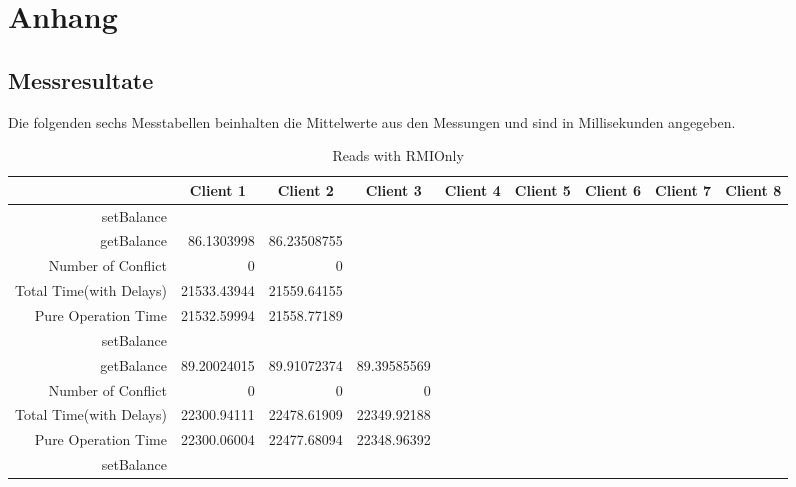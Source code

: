 
\chapter{Anhang}
\label{sec:messresultate}

\section{Messresultate}
\label{sec:messresultate-1}

Die folgenden sechs Messtabellen beinhalten die Mittelwerte aus den Messungen und sind in Millisekunden angegeben.

\begin{landscape}
\begin{table}[htbp]
  \scriptsize
  \centering
  \caption{Reads with RMIOnly}
    \begin{tabular}{rrrrrrrrr}
    \toprule
          & \multicolumn{1}{c}{Client 1} & \multicolumn{1}{c}{Client 2} & \multicolumn{1}{c}{Client 3} & \multicolumn{1}{c}{Client  4} & \multicolumn{1}{c}{Client 5} & \multicolumn{1}{c}{Client 6} & \multicolumn{1}{c}{Client 7} & \multicolumn{1}{c}{Client 8} \\
    \midrule
    setBalance &       &       &       &       &       &       &       &  \\
    getBalance & 86.1303998 & 86.23508755 &       &       &       &       &       &  \\
    Number of Conflict & 0     & 0     &       &       &       &       &       &  \\
    Total Time(with Delays) & 21533.43944 & 21559.64155 &       &       &       &       &       &  \\
    Pure Operation Time & 21532.59994 & 21558.77189 &       &       &       &       &       &  \\
     \cline{1-9}
    setBalance &       &       &       &       &       &       &       &  \\
    getBalance & 89.20024015 & 89.91072374 & 89.39585569 &       &       &       &       &  \\
    Number of Conflict & 0     & 0     & 0     &       &       &       &       &  \\
    Total Time(with Delays) & 22300.94111 & 22478.61909 & 22349.92188 &       &       &       &       &  \\
    Pure Operation Time & 22300.06004 & 22477.68094 & 22348.96392 &       &       &       &       &  \\
    \cline{1-9}
    setBalance &       &       &       &       &       &       &       &  \\

\end{tabular}
\end{table}
\end{landscape}
